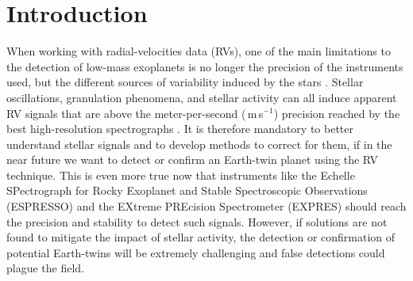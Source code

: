 \documentclass{aa}
\def\ms{\hbox{\,m\,s$^{-1}$}}         %
\begin{document}


\maketitle

\section{Introduction} \label{intro}


When working with radial-velocities data (RVs), one of the main limitations to the detection of low-mass exoplanets is no longer the precision of the instruments used, but the different sources of variability induced by the stars \citep[e.g.][]{Feng:2017aa, Dumusque:2017aa, Rajpaul-2015, Robertson-2014}. 
Stellar oscillations, granulation phenomena, and stellar activity can all induce apparent RV signals that are above the meter-per-second (\ms) precision \citep[e.g.][]{Saar-1997b, Queloz-2001, Desort-2007, Dumusque-2011a, Dumusque-2016a} reached by the best high-resolution spectrographs \citep[HARPS, HARPS-N,][]{Mayor-2003,Cosentino-2012}.
%
It is therefore mandatory to better understand stellar signals and to develop methods to correct for them, if in the near future we want to detect or confirm an Earth-twin planet using the RV technique. This is even more true now that instruments like the Echelle SPectrograph for Rocky Exoplanet and Stable Spectroscopic Observations (ESPRESSO) \citep{Pepe-2014} and the EXtreme PREcision Spectrometer (EXPRES) \citep{fischer2016state} should reach the precision and stability to detect such signals. However, if solutions are not found to mitigate the impact of stellar activity, the detection or confirmation of potential Earth-twins will be extremely challenging and false detections could plague the field.

\end{document}
